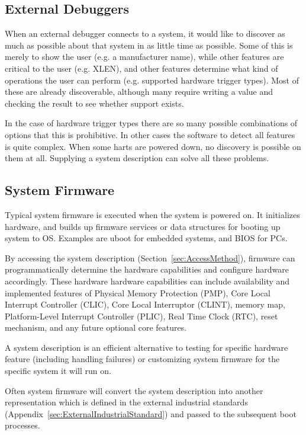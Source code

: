 \subsection{External Debuggers}

When an external debugger connects to a system, it would like to discover as
much as possible about that system in as little time as possible. Some of this
is merely to show the user (e.g. a manufacturer name), while other features are
critical to the user (e.g. XLEN), and other features determine what kind of
operations the user can perform (e.g. supported hardware trigger types). Most
of these are already discoverable, although many require writing a value and
checking the result to see whether support exists.

In the case of hardware trigger types there are so many possible combinations
of options that this is prohibitive. In other cases the software to detect all
features is quite complex. When some harts are powered down, no discovery is
possible on them at all. Supplying a system description can solve all these
problems.

\subsection{System Firmware}

Typical system firmware is executed when the system is powered on. It
initializes hardware, and builds up firmware services or data structures for
booting up system to OS. Examples are uboot for embedded systems, and BIOS for
PCs.

By accessing the system description (Section~\ref{sec:AccessMethod}), firmware
can programmatically determine the hardware capabilities and configure hardware
accordingly.  These hardware hardware capabilities can include availability and
implemented features of Physical Memory Protection (PMP), Core Local Interrupt
Controller (CLIC), Core Local Interruptor (CLINT), memory map, Platform-Level
Interrupt Controller (PLIC), Real Time Clock (RTC), reset mechanism, and any
future optional core features.

A system description is an efficient alternative to testing for specific
hardware feature (including handling failures) or customizing system firmware
for the specific system it will run on.

Often system firmware will convert the system description into another
representation which is defined in the external industrial standards
(Appendix~\ref{sec:ExternalIndustrialStandard}) and passed to the subsequent
boot processes.


